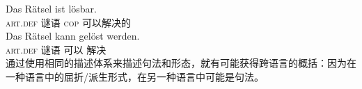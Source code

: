 \eal
\ex 
\gll Das Rätsel ist lösbar.\\
    \textsc{art}.\textsc{def} 谜语 \textsc{cop} 可以解决的\\
\ex 
\gll Das Rätsel kann gelöst werden.\\
     \textsc{art}.\textsc{def} 谜语 可以 解决 \passive\\
\zl
通过使用相同的描述体系来描述句法和形态，就有可能获得跨语言的概括：因为在一种语言中的屈折/派生形式，在另一种语言中可能是句法。

